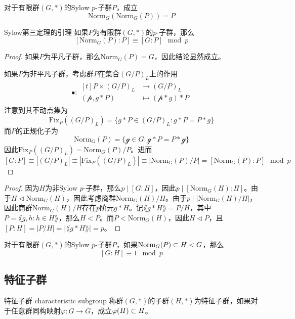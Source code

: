 \begin{proposition}
	对于有限群$(G,*)$的Sylow $p$-子群$P$，成立
	$$
	\mathrm{Norm}_G(\mathrm{Norm}_G(P))=P
	$$
\end{proposition}

\begin{lemma}{}{Sylow第三定理的引理}
	如果$P$为有限群$(G,*)$的$p$-子群，那么
	$$
	[\mathrm{Norm}_G(P):P]\equiv [G:P]\mod p
	$$
\end{lemma}

\begin{proof}
	如果$P$为平凡子群，那么$\mathrm{Norm}_G(P)=G$，因此结论显然成立。
	
	如果$P$为非平凡子群，考虑群$P$在集合$(G/P)_L$上的作用
	\begin{align*}
		\bullet:\begin{aligned}[t]
			P\times (G/P)_L&\longrightarrow (G/P)_L\\
			(\mathcal{p},g*P)&\longmapsto(\mathcal{p}*g)*P
		\end{aligned}
	\end{align*}
	注意到其不动点集为
	$$
	\mathrm{Fix}_{P}((G/P)_L)=\{ g*P\in (G/P)_L:g*P=P*g \}
	$$
	而$P$的正规化子为
	$$
	\mathrm{Norm}_G(P)=\{ \mathcal{g}\in G: \mathcal{g}*P=P*\mathcal{g}\}
	$$
	因此$\mathrm{Fix}_{P}((G/P)_L)= \mathrm{Norm}_{G}(P)/P$。进而
	$$
	[G:P]\equiv|(G/P)_L|\equiv |\mathrm{Fix}_{P}((G/P)_L)|\equiv |\mathrm{Norm}_G(P)/P|=[\mathrm{Norm}_G(P):P]\mod p
	$$
\end{proof}

\begin{proof}
	因为$H$为非Sylow $p$-子群，那么$p\mid [G:H]$，因此$p\mid [\mathrm{Norm}_G(H):H]$。由于$H\lhd \mathrm{Norm}_G(H)$，因此考虑商群$\mathrm{Norm}_G(H)/H$。由于$p\mid |\mathrm{Norm}_G(H)/H|$，因此商群$\mathrm{Norm}_G(H)/H$存在$p$阶元$g*H $。记$\lang g*H\rang=P/H$，其中$P=\lang g,h:h\in H\rang$，那么$H< P$。而$P<\mathrm{Norm}_G(H)$，因此$H\lhd P$，且$[P:H]=|P/H|=|\lang g*H\rang|=p$。
\end{proof}

\begin{proposition}
	对于有限群$(G,*)$的Sylow $p$-子群$P$，如果$\mathrm{Norm}_G(P)\subset H<G$，那么
	$$
	[G:H]\equiv 1\mod p
	$$
\end{proposition}

\subsection{特征子群}

\begin{definition}{特征子群 characteristic subgroup}
	称群$(G,*)$的子群$(H,*)$为特征子群，如果对于任意群同构映射$\varphi:G\to G$，成立$\varphi(H)\subset H$。
\end{definition}

